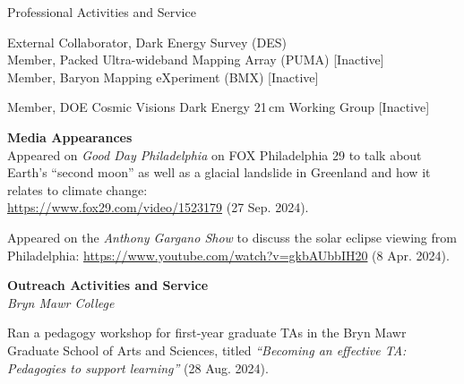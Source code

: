 \documentclass{resume} %
\begin{document}
\begin{rSection}{Professional Activities and Service}

\begin{description}[leftmargin=10em, style=nextline]

\item[Collaborations] External Collaborator, Dark Energy Survey (DES)\\
  Member, Packed Ultra-wideband Mapping Array (PUMA) [Inactive]\\
  Member, Baryon Mapping eXperiment (BMX) [Inactive]

\item[Working Groups] Member, DOE Cosmic Visions Dark Energy 21$\,$cm Working Group [Inactive]


\end{description}
\textbf{Media Appearances}\\
Appeared on \textit{Good Day Philadelphia} on FOX Philadelphia 29 to talk about Earth's ``second moon'' as well as a glacial landslide in Greenland and how it relates to climate change: \\
\href{https://www.fox29.com/video/1523179}{https://www.fox29.com/video/1523179} (27 Sep. 2024).

Appeared on the \textit{Anthony Gargano Show} to discuss the solar eclipse viewing from Philadelphia: \href{https://www.youtube.com/watch?v=gkbAUbbIH20}{https://www.youtube.com/watch?v=gkbAUbbIH20} (8 Apr. 2024).

\textbf{Outreach Activities and Service}\\
\textit{Bryn Mawr College}
\begin{description}[leftmargin=2em, style=nextline]
\vspace{-0.5em}
\item[~] Ran a pedagogy workshop for first-year graduate TAs in the Bryn Mawr Graduate School of Arts and Sciences, titled \textit{``Becoming an effective TA: Pedagogies to support learning''} (28 Aug. 2024).
\end{description}



\end{rSection}
\end{document}
